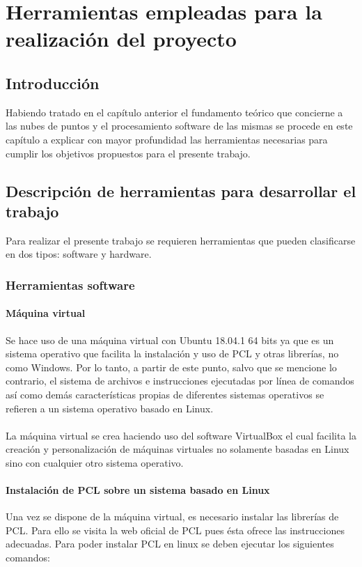 \chapter{Herramientas empleadas para la realización del proyecto}

\section{Introducción}
Habiendo tratado en el capítulo anterior el fundamento teórico que concierne a las nubes de puntos y el procesamiento software de las mismas se procede en este capítulo a explicar con mayor profundidad las herramientas necesarias para cumplir los objetivos propuestos para el presente trabajo.



\section{Descripción de herramientas para desarrollar el trabajo}
Para realizar el presente trabajo se requieren herramientas que pueden clasificarse en dos tipos: software y hardware.

\subsection{Herramientas software}
\subsubsection{Máquina virtual}
Se hace uso de una máquina virtual con Ubuntu\cite{ubuntu} 18.04.1 64 bits ya que es un sistema operativo que facilita la instalación y uso de PCL y otras librerías, no como Windows.
Por lo tanto, a partir de este punto, salvo que se mencione lo contrario, el sistema de archivos e instrucciones ejecutadas por línea de comandos así como demás características propias de diferentes sistemas operativos se refieren a un sistema operativo basado en Linux.
\\
\\
La máquina virtual se crea haciendo uso del software VirtualBox\cite{virtualbox} el cual facilita la creación y personalización de máquinas virtuales no solamente basadas en Linux sino con cualquier otro sistema operativo.

\subsubsection{Instalación de PCL sobre un sistema basado en Linux}
Una vez se dispone de la máquina virtual, es necesario instalar las librerías de PCL\cite{pcl_installation}. Para ello se visita la web oficial de PCL pues ésta ofrece las instrucciones adecuadas. Para poder instalar PCL en linux se deben ejecutar los siguientes comandos:

